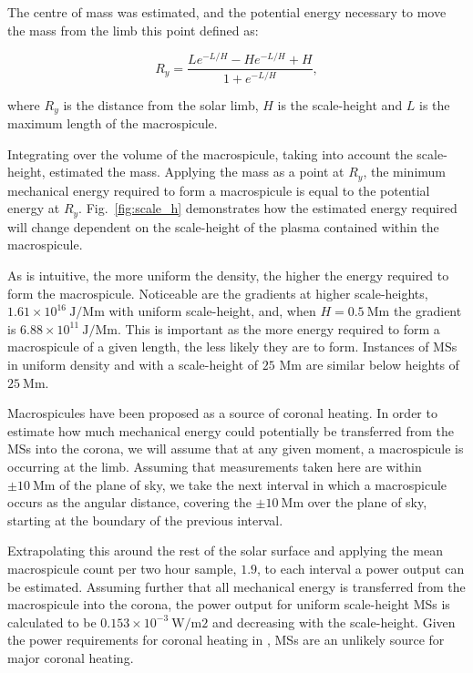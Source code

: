 The centre of mass was estimated, and the potential energy necessary to move the mass from the limb this point defined as:

\begin{equation}
R_y = \frac{Le^{-L/H} - He^{-L/H} + H}{1 + e^{-L/H}},
\end{equation} 

\noindent where $R_y$ is the distance from the solar limb, $H$ is the scale-height and $L$ is the maximum length of the macrospicule.

Integrating over the volume of the macrospicule, taking into account the scale-height, estimated the mass. Applying the mass as a point at $R_y$, the minimum mechanical energy required to form a macrospicule is equal to the potential energy at $R_y$. Fig.~\ref{fig:scale_h} demonstrates how the estimated energy required will change dependent on the scale-height of the plasma contained within the macrospicule.

As is intuitive, the more uniform the density, the higher the energy required to form the macrospicule. Noticeable are the gradients at higher scale-heights, $1.61 \times 10^{16}\ \textrm{J/Mm}$ with uniform scale-height, and, when $H = 0.5\ \textrm{Mm}$ the gradient is  $6.88 \times 10^{11}\ \textrm{J/Mm}$. This is important as the more energy required to form a macrospicule of a given length, the less likely they are to form. Instances of MSs in uniform density and with a scale-height of $25$ Mm are similar below heights of $25\ \textrm{Mm}$.

Macrospicules have been proposed as a source of coronal heating. In order to estimate how much mechanical energy could potentially be transferred from the MSs into the corona, we will assume that at any given moment, a macrospicule is occurring at the limb. Assuming that measurements taken here are within $\pm10\ \textrm{Mm}$ of the plane of sky, we take the next interval in which a macrospicule occurs as the angular distance, covering the $\pm10\ \textrm{Mm}$ over the plane of sky, starting at the boundary of the previous interval. 

Extrapolating this around the rest of the solar surface and applying the mean macrospicule count per two hour sample, $1.9$, to each interval a power output can be estimated. Assuming further that all mechanical energy is transferred from the macrospicule into the corona, the power output for uniform scale-height MSs is calculated to be $0.153 \times 10^{-3}\ \textrm{W/m{2}}$ and decreasing with the scale-height. Given the power requirements for coronal heating in \cite{AschwandenCHR2007}, MSs are an unlikely source for major coronal heating.


